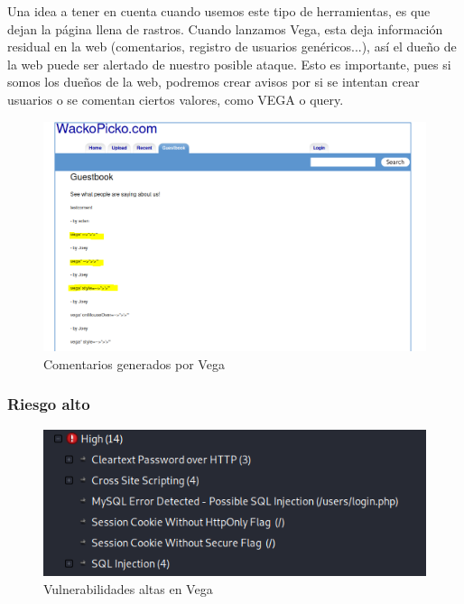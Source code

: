 \documentclass[12pt,twoside]{article}
\begin{document}
Una idea a tener en cuenta cuando usemos este tipo de herramientas, es que dejan la página llena de rastros.  Cuando lanzamos Vega, esta deja información residual en la web (comentarios, registro de usuarios genéricos...), así el dueño de la web puede ser alertado de nuestro posible ataque. Esto es importante, pues si somos los dueños de la web, podremos crear avisos por si se intentan crear usuarios o se comentan ciertos valores, como VEGA o query.
\begin{figure}[H]
    \centering
    \includegraphics[scale=0.5]{./imagenes/comentarios_vega}
    \caption{Comentarios generados por Vega}
\end{figure}

\subsubsection{Riesgo alto}
\begin{figure}[H]
    \centering
    \includegraphics[scale=0.8]{./imagenes/riesgo_alto}
    \caption{Vulnerabilidades altas en Vega}
\end{figure}
\end{document}

